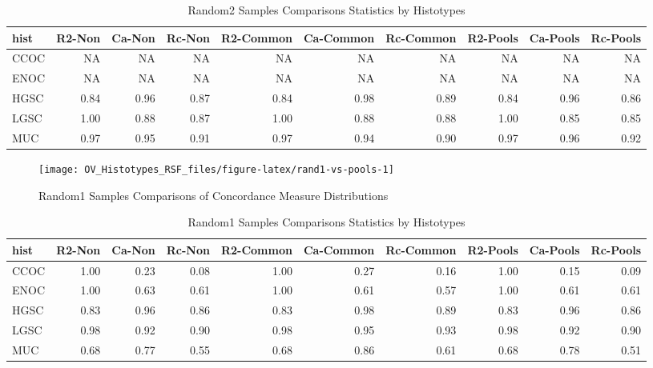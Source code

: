 \documentclass[
]{report}
\begin{document}
\begin{table}

\caption{\label{tab:rand2-vs-pools-stats}Random2 Samples Comparisons Statistics by Histotypes}
\centering
\begin{tabular}[t]{l|r|r|r|r|r|r|r|r|r}
\hline
hist & R2-Non & Ca-Non & Rc-Non & R2-Common & Ca-Common & Rc-Common & R2-Pools & Ca-Pools & Rc-Pools\\
\hline
CCOC & NA & NA & NA & NA & NA & NA & NA & NA & NA\\
\hline
ENOC & NA & NA & NA & NA & NA & NA & NA & NA & NA\\
\hline
HGSC & 0.84 & 0.96 & 0.87 & 0.84 & 0.98 & 0.89 & 0.84 & 0.96 & 0.86\\
\hline
LGSC & 1.00 & 0.88 & 0.87 & 1.00 & 0.88 & 0.88 & 1.00 & 0.85 & 0.85\\
\hline
MUC & 0.97 & 0.95 & 0.91 & 0.97 & 0.94 & 0.90 & 0.97 & 0.96 & 0.92\\
\hline
\end{tabular}
\end{table}

\begin{figure}[H]

{\centering \texttt{[image: OV\_Histotypes\_RSF\_files/figure-latex/rand1-vs-pools-1]} 

}

\caption{Random1 Samples Comparisons of Concordance Measure Distributions}\label{fig:rand1-vs-pools}
\end{figure}

\begin{table}

\caption{\label{tab:rand1-vs-pools-stats}Random1 Samples Comparisons Statistics by Histotypes}
\centering
\begin{tabular}[t]{l|r|r|r|r|r|r|r|r|r}
\hline
hist & R2-Non & Ca-Non & Rc-Non & R2-Common & Ca-Common & Rc-Common & R2-Pools & Ca-Pools & Rc-Pools\\
\hline
CCOC & 1.00 & 0.23 & 0.08 & 1.00 & 0.27 & 0.16 & 1.00 & 0.15 & 0.09\\
\hline
ENOC & 1.00 & 0.63 & 0.61 & 1.00 & 0.61 & 0.57 & 1.00 & 0.61 & 0.61\\
\hline
HGSC & 0.83 & 0.96 & 0.86 & 0.83 & 0.98 & 0.89 & 0.83 & 0.96 & 0.86\\
\hline
LGSC & 0.98 & 0.92 & 0.90 & 0.98 & 0.95 & 0.93 & 0.98 & 0.92 & 0.90\\
\hline
MUC & 0.68 & 0.77 & 0.55 & 0.68 & 0.86 & 0.61 & 0.68 & 0.78 & 0.51\\
\hline
\end{tabular}
\end{table}
\end{document}
